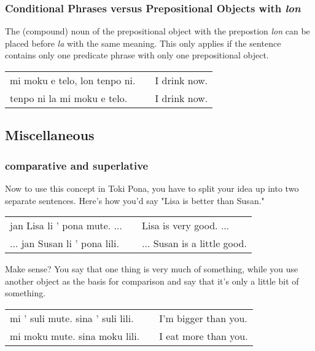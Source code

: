 %
\subsubsection*{Conditional Phrases versus Prepositional Objects with \textit{lon} }
%
The (compound) noun of the prepositional object with the prepostion \textit{lon} can be placed before \textit{la} with the same meaning.
This only applies if the sentence contains only one predicate phrase with only one prepositional object. 

\begin{supertabular}{p{5,5cm}|ll}
mi moku e telo, lon tenpo ni. && I drink now. \\
tenpo ni la mi moku e telo.  && I drink now. \\
\end{supertabular} 

%
\subsection*{Miscellaneous}
\subsubsection*{comparative and superlative} 
%
Now to use this concept in Toki Pona, you have to split your idea up into two separate sentences. 
Here's how you'd say "Lisa is better than Susan."

\begin{supertabular}{p{5,5cm}|ll}
jan Lisa li ' pona mute. ...  && Lisa is very good. ... \\ %
... jan Susan li ' pona lili. && ... Susan is a little good. \\ %
\end{supertabular} 

Make sense? 
You say that one thing is very much of something, while you use another object as the basis for comparison and say that it's only a little bit of something. 

\begin{supertabular}{p{5,5cm}|ll}
mi ' suli mute. sina ' suli lili. && I'm bigger than you. \\
mi moku mute. sina moku lili. && I eat more than you. \\
\end{supertabular} 
%
